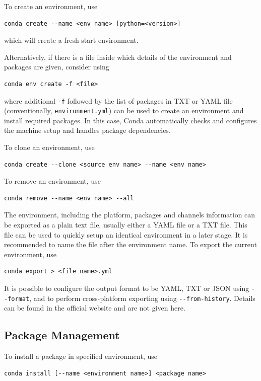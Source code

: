 To create an environment, use
\begin{lstlisting}
conda create --name <env name> [python=<version>]
\end{lstlisting}
which will create a fresh-start environment.

Alternatively, if there is a file inside which details of the environment and packages are given, consider using
\begin{lstlisting}
conda env create -f <file>
\end{lstlisting}

where additional \verb|-f| followed by the list of packages in TXT or YAML file (conventionally, \verb|environment.yml|) can be used to create an environment and install required packages. In this case, Conda automatically checks and configures the machine setup and handles package dependencies. 

To clone an environment, use
\begin{lstlisting}
conda create --clone <source env name> --name <env name>
\end{lstlisting}

To remove an environment, use
\begin{lstlisting}
conda remove --name <env name> --all
\end{lstlisting}

The environment, including the platform, packages and channels information can be exported as a plain text file, usually either a YAML file or a TXT file. This file can be used to quickly setup an identical environment in a later stage. It is recommended to name the file after the environment name. To export the current environment, use
\begin{lstlisting}
conda export > <file name>.yml
\end{lstlisting}
It is possible to configure the output format to be YAML, TXT or JSON using \verb|--format|, and to perform cross-platform exporting using \verb|--from-history|. Details can be found in the official website and are not given here.

\subsection{Package Management}

To install a package in specified environment, use
\begin{lstlisting}
conda install [--name <environment name>] <package name>
\end{lstlisting}

